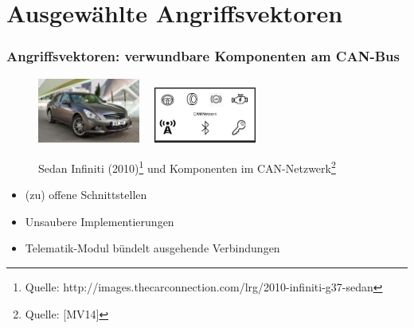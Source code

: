 \documentclass[t]{beamer}
\begin{document}
\section{Ausgewählte Angriffsvektoren} %
\begin{frame}
	\frametitle{Angriffsvektoren: verwundbare Komponenten am CAN-Bus}
    \begin{center}
    	\begin{figure}
			\includegraphics[width=0.3\textwidth]{pic/remote_attack_images-026.jpg} \ \
			\includegraphics[width=0.3\textwidth]{pic/remote_attack_images-027.jpg}
      	  	\caption[2010 Infiniti G37 (Sedan)]{Sedan Infiniti (2010)\footnote{Quelle: http://images.thecarconnection.com/lrg/2010-infiniti-g37-sedan} und Komponenten im CAN-Netzwerk\footnote{Quelle: {[}MV14{]}}}
		\end{figure}
	\end{center}
	\begin{itemize}
		\item (zu) offene Schnittstellen
  	    \item Unsaubere Implementierungen
        \item Telematik-Modul bündelt ausgehende Verbindungen
	\end{itemize}
\end{frame}
\end{document}
